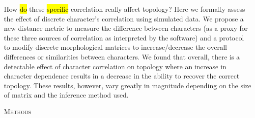 \documentclass[12pt,letterpaper]{article}
\renewcommand{\section}[1]{%
\bigskip
\begin{center}
\begin{Large}
\normalfont\scshape #1
\medskip
\end{Large}
\end{center}}
\begin{document}
How \hl{do} these \hl{specific} correlation really affect topology?
Here we formally assess the effect of discrete character's correlation using simulated data.
We propose a new distance metric to measure the difference between characters (as a proxy for these three sources of correlation as interpreted by the software) and a protocol to modify discrete morphological matrices to increase/decrease the overall differences or similarities between characters.
We found that overall, there is a detectable effect of character correlation on topology where an increase in character dependence results in a decrease in the ability to recover the correct topology.
These results, however, vary greatly in magnitude depending on the size of matrix and the inference method used.

\section{Methods}
\end{document}
